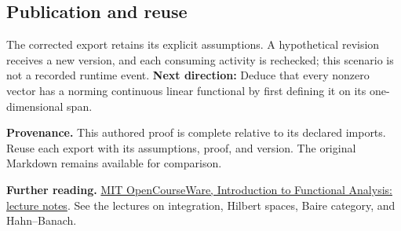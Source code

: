 \documentclass[preprint,12pt,aps,pra,showkeys,amsmath,amssymb,superscriptaddress,floatfix]{revtex4-2}
\theoremstyle{definition}
\theoremstyle{remark}
\begin{document}
\subsection{Publication and reuse}
The corrected export retains its explicit assumptions. A hypothetical
revision receives a new version, and each consuming activity is
rechecked; this scenario is not a recorded runtime event. \textbf{Next
direction:} Deduce that every nonzero vector has a norming continuous
linear functional by first defining it on its one-dimensional span.

\par\medskip\begingroup\small\linespread{1.0}\selectfont\noindent\textbf{Provenance.} This authored proof is complete relative to its declared imports. Reuse
each export with its assumptions, proof, and version. The original
Markdown remains available for comparison.
\par\endgroup

\par\smallskip\begingroup\small\linespread{1.0}\selectfont\noindent\textbf{Further reading.} \href{https://ocw.mit.edu/courses/18-102-introduction-to-functional-analysis-spring-2021/resources/lecture-notes/}{MIT
OpenCourseWare, Introduction to Functional Analysis: lecture notes}. See
the lectures on integration, Hilbert spaces, Baire category, and
Hahn--Banach.\par\endgroup
\end{document}

